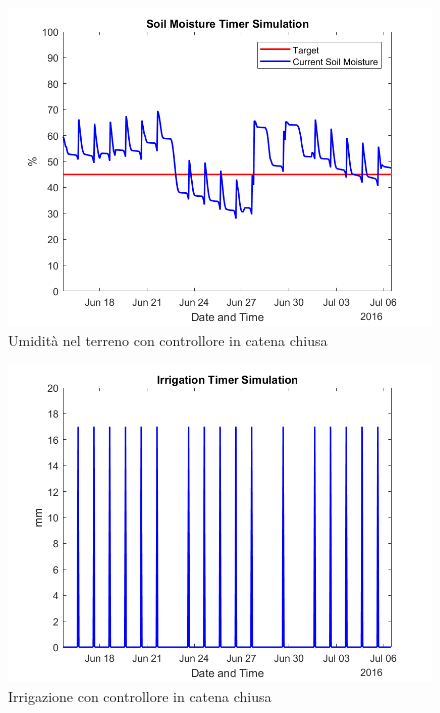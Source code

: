 \documentclass[conference,10pt]{IEEEtran}
\begin{document}
\begin{figure}[ht]
	\centering
	\includegraphics[width=0.9\linewidth]{images/soil_moisture_timer.png}
	\caption{Umidità nel terreno con controllore in catena chiusa}
	\label{fig:MAD}
\end{figure}
\vspace*{-0.5 cm}
\begin{figure}[ht]
	\centering
	\includegraphics[width=0.9\linewidth]{images/irrigation_timer.png}
	\caption{Irrigazione con controllore in catena chiusa}
	\label{fig:MAD}
\end{figure}
\end{document}
